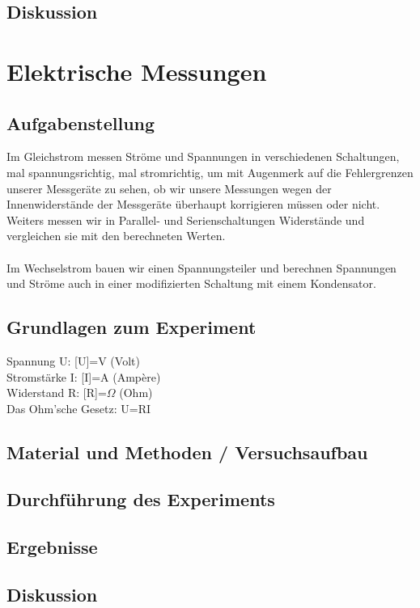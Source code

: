\documentclass{article}
\begin{document}
\subsection{Diskussion}

\section{Elektrische Messungen}
\subsection{Aufgabenstellung}
Im Gleichstrom messen Ströme und Spannungen in verschiedenen Schaltungen, mal spannungsrichtig, mal stromrichtig, um mit Augenmerk auf die Fehlergrenzen unserer Messgeräte zu sehen, ob wir unsere Messungen wegen der Innenwiderstände der Messgeräte überhaupt korrigieren müssen oder nicht.\\
Weiters messen wir in Parallel- und Serienschaltungen Widerstände und vergleichen sie mit den berechneten Werten.\\
\\
Im Wechselstrom bauen wir einen Spannungsteiler und berechnen Spannungen und Ströme auch in einer modifizierten Schaltung mit einem Kondensator.

\subsection{Grundlagen zum Experiment}
Spannung U: [U]=V (Volt)\\
Stromstärke I: [I]=A (Ampère)\\
Widerstand R: [R]=$\Omega$ (Ohm)\\

Das Ohm'sche Gesetz: U=RI

\subsection{Material und Methoden / Versuchsaufbau}

\subsection{Durchführung des Experiments}

\subsection{Ergebnisse}

\subsection{Diskussion}
\end{document}
